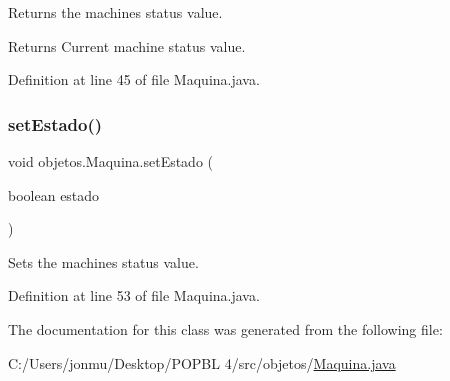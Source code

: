 Returns the machines status value.

\begin{DoxyReturn}{Returns}
Current machine status value. 
\end{DoxyReturn}


Definition at line 45 of file Maquina.\+java.

\mbox{\label{classobjetos_1_1_maquina_a8a5d703c85d9a8a4a7ff352b01ff085b}} 
\subsubsection{\texorpdfstring{set\+Estado()}{setEstado()}}
{\footnotesize\ttfamily void objetos.\+Maquina.\+set\+Estado (\begin{DoxyParamCaption}\item[{boolean}]{estado }\end{DoxyParamCaption})}

Sets the machines status value. 

Definition at line 53 of file Maquina.\+java.



The documentation for this class was generated from the following file\+:\begin{DoxyCompactItemize}
\item 
C\+:/\+Users/jonmu/\+Desktop/\+P\+O\+P\+B\+L 4/src/objetos/\mbox{\hyperlink{_maquina_8java}{Maquina.\+java}}\end{DoxyCompactItemize}

